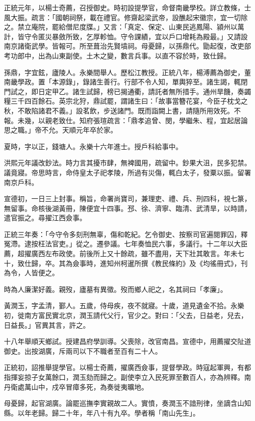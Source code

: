 \begin{pinyinscope}
正統元年，以楊士奇薦，召授御史。時初設提學官，命督南畿學校。詳立教條，士風大振。疏言：「國朝祠祭，載在禮官。修齋起梁武帝，設醮起宋徽宗，宜一切除之。禁立庵院，罷給僧尼度牒。」又言：「真定、保定、山東民逃鳳陽、潁州以萬計，皆守令匿災暴斂所致，乞厚軫恤。守令課績，宜以戶口增耗為殿最。」又請設南京諸衛武學。皆報可。所至葺治先賢墳祠。母憂歸，以孫鼎代。勖起復，改吏部考功郎中，出為山東副使。土木之變，數言兵事。以直不容於時，致仕歸。

孫鼎，字宜鉉，廬陵人。永樂間舉人。歷松江教授。正統八年，楊溥薦為御史，董南畿學政。置「本源錄」，錄諸生善行。行部不令人知，單輿猝至。諸生謁，輒閉門試之，即日定甲乙。諸生試歸，榜已揭通衢，請託者無所措手。通州旱饑，奏蠲糧三千四百餘石。英宗北狩，鼎試罷，謂諸生曰：「故事當簪花宴，今臣子枕戈之秋，不敢陷諸君不義。」設茗飲，步送諸門。既而詣闕上書，請隨所用效死。不報。未幾，以親老致仕。知府張瑄疏言：「鼎孝追曾、閔，學繼朱、程，宜起居論思之職。」帝不允。天順元年卒於家。

夏時，字以正，錢塘人。永樂十六年進士。授戶科給事中。

洪熙元年議改鈔法。時力言其擾市肆，無裨國用，疏留中。鈔果大沮，民多犯禁。議竟寢。帝思時言，命侍皇太子祀孝陵，所過有災傷，輒白太子，發粟以振。留署南京戶科。

宣德初，一日三上封事。稱旨，命署尚寶司，兼理吏、禮、兵、刑四科，視七篆，無留事。命核後湖黃冊，陳便宜十四事。邳、徐、濟寧、臨清、武清旱，以時請，遣官振之。尋擢江西僉事。

正統三年奏：「今守令多刻刑無辜，傷和乾紀。乞令御史、按察司官遍閱罪囚，釋冤滯。逮按枉法官吏。」從之。遷參議。七年奏恤民六事，多議行。十二年以大臣薦，超擢廣西左布政使。前後所上又十餘疏，雖不盡用，天下壯其敢言。年未七十，致仕歸，卒。其為僉事時，進知州柯暹所撰《教民條約》及《均徭冊式》，刊為令，人皆便之。

時為人廉潔好義。親歿，廬墓有異徵。歿而鄉人祀之，名其祠曰「孝廉」。

黃潤玉，字孟清，鄞人。五歲，侍母疾，夜不就寢。十歲，道見遺金不拾。永樂初，徙南方富民實北京，潤玉請代父行，官少之。對曰：「父去，日益老，兒去，日益長。」官異其言，許之。

十八年舉順天鄉試。授建昌府學訓導。父喪除，改官南昌。宣德中，用薦擢交阯道御史。出按湖廣，斥兩司以下不職者至百有二十人。

正統初，詔推舉提學官。以楊士奇薦，擢廣西僉事，提督學政。時寇起軍興，有都指揮妄掠子女萬餘口，潤玉劾而歸之。副使李立入民死罪至數百人，亦為辨釋。南丹衛處萬山中，戍卒冒瘴多死，為奏徙夷曠地。

母憂歸，起官湖廣。論罷巡撫李實親故二人。實憤，奏潤玉不諳刑律，坐謫含山知縣。以年老歸。歸二十年，年八十有九卒。學者稱「南山先生」。


\end{pinyinscope}
